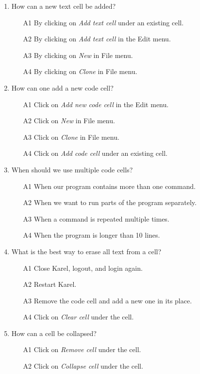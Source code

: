 \begin{enumerate}
\item How can a new text cell be added?
\begin{enumerate}
\item[A1] By clicking on {\em Add text cell} under an existing cell.
\item[A2] By clicking on {\em Add text cell} in the Edit menu.
\item[A3] By clicking on {\em New} in File menu.
\item[A4] By clicking on {\em Clone} in File menu.
\end{enumerate}
\item How can one add a new code cell?
\begin{enumerate}
\item[A1] Click on {\em Add new code cell} in the Edit menu.
\item[A2] Click on {\em New} in File menu.
\item[A3] Click on {\em Clone} in File menu.
\item[A4] Click on {\em Add code cell} under an existing cell.
\end{enumerate}
\item When should we use multiple code cells?
\begin{enumerate}
\item[A1] When our program contains more than one command.
\item[A2] When we want to run parts of the program separately.
\item[A3] When a command is repeated multiple times.
\item[A4] When the program is longer than 10 lines.
\end{enumerate}
\item What is the best way to erase all text from a cell?
\begin{enumerate}
\item[A1] Close Karel, logout, and login again. 
\item[A2] Restart Karel.
\item[A3] Remove the code cell and add a new one in its place.
\item[A4] Click on {\em Clear cell} under the cell.
\end{enumerate}
\item How can a cell be collapsed?
\begin{enumerate}
\item[A1] Click on {\em Remove cell} under the cell.
\item[A2] Click on {\em Collapse cell} under the cell.

\end{enumerate}
\end{enumerate}
